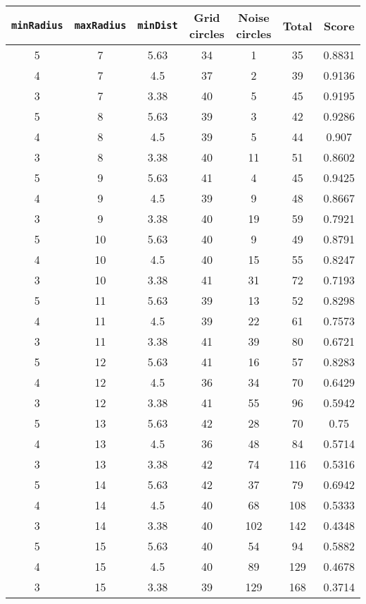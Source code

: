 \documentclass[letterpaper, 12pt]{article}
\begin{document}
\begin{longtable}{|c|c|c|c|c|c|c|}
\hline
\textbf{\texttt{minRadius}} & \textbf{\texttt{maxRadius}} & \textbf{\texttt{minDist}} & \textbf{Grid circles} & \textbf{Noise circles} & \textbf{Total} & \textbf{Score} \\
\hline
5 & 7 & 5.63 & 34 & 1 & 35 & 0.8831 \\
\hline
4 & 7 & 4.5 & 37 & 2 & 39 & 0.9136 \\
\hline
3 & 7 & 3.38 & 40 & 5 & 45 & 0.9195 \\
\hline
5 & 8 & 5.63 & 39 & 3 & 42 & 0.9286 \\
\hline
4 & 8 & 4.5 & 39 & 5 & 44 & 0.907 \\
\hline
3 & 8 & 3.38 & 40 & 11 & 51 & 0.8602 \\
\hline
5 & 9 & 5.63 & 41 & 4 & 45 & 0.9425 \\
\hline
4 & 9 & 4.5 & 39 & 9 & 48 & 0.8667 \\
\hline
3 & 9 & 3.38 & 40 & 19 & 59 & 0.7921 \\
\hline
5 & 10 & 5.63 & 40 & 9 & 49 & 0.8791 \\
\hline
4 & 10 & 4.5 & 40 & 15 & 55 & 0.8247 \\
\hline
3 & 10 & 3.38 & 41 & 31 & 72 & 0.7193 \\
\hline
5 & 11 & 5.63 & 39 & 13 & 52 & 0.8298 \\
\hline
4 & 11 & 4.5 & 39 & 22 & 61 & 0.7573 \\
\hline
3 & 11 & 3.38 & 41 & 39 & 80 & 0.6721 \\
\hline
5 & 12 & 5.63 & 41 & 16 & 57 & 0.8283 \\
\hline
4 & 12 & 4.5 & 36 & 34 & 70 & 0.6429 \\
\hline
3 & 12 & 3.38 & 41 & 55 & 96 & 0.5942 \\
\hline
5 & 13 & 5.63 & 42 & 28 & 70 & 0.75 \\
\hline
4 & 13 & 4.5 & 36 & 48 & 84 & 0.5714 \\
\hline
3 & 13 & 3.38 & 42 & 74 & 116 & 0.5316 \\
\hline
5 & 14 & 5.63 & 42 & 37 & 79 & 0.6942 \\
\hline
4 & 14 & 4.5 & 40 & 68 & 108 & 0.5333 \\
\hline
3 & 14 & 3.38 & 40 & 102 & 142 & 0.4348 \\
\hline
5 & 15 & 5.63 & 40 & 54 & 94 & 0.5882 \\
\hline
4 & 15 & 4.5 & 40 & 89 & 129 & 0.4678 \\
\hline
3 & 15 & 3.38 & 39 & 129 & 168 & 0.3714 \\

\end{longtable}
\end{document}
